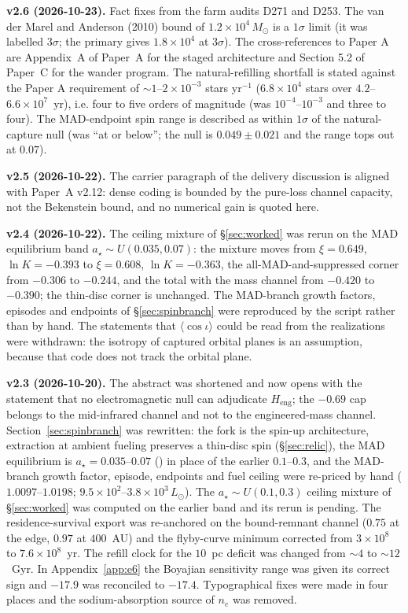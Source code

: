 \documentclass[11pt]{article}
\newcommand{\astar}{\ensuremath{a_\star}}
\newcommand{\lnK}{\ensuremath{\ln K}}
\newcommand{\Heng}{\ensuremath{H_{\mathrm{eng}}}}
\begin{document}
\textbf{v2.6 (2026-10-23).} Fact fixes from the farm audits D271 and D253. The van der Marel and Anderson (2010) bound of $1.2\times10^{4}\,M_{\odot}$ is a $1\sigma$ limit (it was labelled $3\sigma$; the primary gives $1.8\times10^{4}$ at $3\sigma$). The cross-references to Paper A are Appendix~A of Paper~A for the staged architecture and Section 5.2 of Paper~C for the wander program. The natural-refilling shortfall is stated against the Paper A requirement of $\sim 1$--$2\times10^{-3}$ stars yr$^{-1}$ ($6.8\times10^{4}$ stars over $4.2$--$6.6\times10^{7}$~yr), i.e. four to five orders of magnitude (was $10^{-4}$--$10^{-3}$ and three to four). The MAD-endpoint spin range is described as within $1\sigma$ of the natural-capture null (was ``at or below''; the null is $0.049 \pm 0.021$ and the range tops out at $0.07$).

\textbf{v2.5 (2026-10-22).} The carrier paragraph of the delivery discussion is aligned with Paper~A v2.12: dense coding is bounded by the pure-loss channel capacity, not the Bekenstein bound, and no numerical gain is quoted here.

\textbf{v2.4 (2026-10-22).} The ceiling mixture of \S\ref{sec:worked} was rerun on the MAD equilibrium band $\astar \sim U(0.035, 0.07)$: the mixture moves from $\xi = 0.649$, $\lnK = -0.393$ to $\xi = 0.608$, $\lnK = -0.363$, the all-MAD-and-suppressed corner from $-0.306$ to $-0.244$, and the total with the mass channel from $-0.420$ to $-0.390$; the thin-disc corner is unchanged. The MAD-branch growth factors, episodes and endpoints of \S\ref{sec:spinbranch} were reproduced by the script rather than by hand. The statements that $\langle\cos\iota\rangle$ could be read from the \citet{GonzalezPrieto2025} realizations were withdrawn: the isotropy of captured orbital planes is an assumption, because that code does not track the orbital plane.

\textbf{v2.3 (2026-10-20).} The abstract was shortened and now opens with the statement that no electromagnetic null can adjudicate \Heng; the $-0.69$ cap belongs to the mid-infrared channel and not to the engineered-mass channel. Section~\ref{sec:spinbranch} was rewritten: the fork is the spin-up architecture, extraction at ambient fueling preserves a thin-disc spin (\S\ref{sec:relic}), the MAD equilibrium is $\astar = 0.035$--$0.07$ (\citealt{Narayan2022}) in place of the earlier $0.1$--$0.3$, and the MAD-branch growth factor, episode, endpoints and fuel ceiling were re-priced by hand ($1.0097$--$1.0198$; $9.5\times10^{2}$--$3.8\times10^{3}\,L_{\odot}$). The $\astar \sim U(0.1, 0.3)$ ceiling mixture of \S\ref{sec:worked} was computed on the earlier band and its rerun is pending. The residence-survival export was re-anchored on the bound-remnant channel ($0.75$ at the edge, $0.97$ at $400$~AU) and the flyby-curve minimum corrected from $3\times10^{8}$ to $7.6\times10^{8}$~yr. The refill clock for the $10$~pc deficit was changed from $\sim 4$ to $\sim 12$~Gyr. In Appendix~\ref{app:e6} the Boyajian sensitivity range was given its correct sign and $-17.9$ was reconciled to $-17.4$. Typographical fixes were made in four places and the sodium-absorption source of $n_{e}$ was removed.
\end{document}
